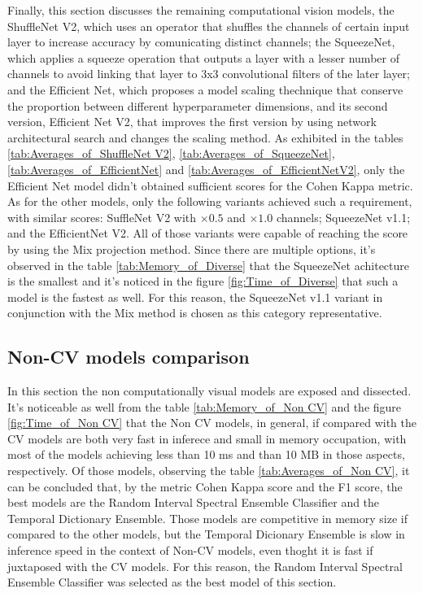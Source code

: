 Finally, this section discusses the remaining computational vision models, the ShuffleNet V2, which uses an operator that shuffles the channels of certain input layer to increase accuracy by comunicating distinct channels; the SqueezeNet, which applies a squeeze operation that outputs a layer with a lesser number of channels to avoid linking that layer to 3x3 convolutional filters of the later layer; and the Efficient Net, which proposes a model scaling thechnique that conserve the proportion between different hyperparameter dimensions, and its second version, Efficient Net V2, that improves the first version by using network architectural search and changes the scaling method. As exhibited in the tables \ref{tab:Averages_of_ShuffleNet V2}, \ref{tab:Averages_of_SqueezeNet}, \ref{tab:Averages_of_EfficientNet} and \ref{tab:Averages_of_EfficientNetV2}, only the Efficient Net model didn't obtained sufficient scores for the Cohen Kappa metric. As for the other models, only the following variants achieved such a requirement, with similar scores: SuffleNet V2 with $\times 0.5$ and $\times 1.0$ channels; SqueezeNet v1.1; and the EfficientNet V2. All of those variants were capable of reaching the score by using the \acrshort{Mix} projection method. Since there are multiple options, it's observed in the table \ref{tab:Memory_of_Diverse} that the SqueezeNet achitecture is the smallest and it's noticed in the figure \ref{fig:Time_of_Diverse} that such a model is the fastest as well. For this reason, the SqueezeNet v1.1 variant in conjunction with the \acrshort{Mix} method is chosen as this category representative.






\FloatBarrier

\subsection{Non-CV models comparison}

In this section the non computationally visual models are exposed and dissected. It's noticeable as well from the table \ref{tab:Memory_of_Non CV} and the figure \ref{fig:Time_of_Non CV} that the Non \acrshort{CV} models, in general, if compared with the \acrshort{CV} models are both very fast in inferece and small in memory occupation, with most of the models achieving less than 10 ms and than 10 MB in those aspects, respectively. Of those models, observing the table \ref{tab:Averages_of_Non CV}, it can be concluded that, by the metric Cohen Kappa score and the F1 score, the best models are the Random Interval Spectral Ensemble Classifier and the Temporal Dictionary Ensemble. Those models are competitive in memory size if compared to the other models, but the Temporal Dicionary Ensemble is slow in inference speed in the context of Non-\acrshort{CV} models, even thoght it is fast if juxtaposed with the \acrshort{CV} models. For this reason, the Random Interval Spectral Ensemble Classifier was selected as the best model of this section.

